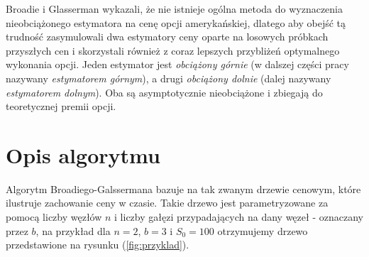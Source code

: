 \documentclass[]{pwr_wmat_praca_dyplomowa}
\theoremstyle{plain}
\numberwithin{theorem}{chapter}
\theoremstyle{definition}
\numberwithin{theorem}{chapter}
\begin{document}
\noindent Broadie i Glasserman wykazali, że nie istnieje ogólna metoda do wyznaczenia nieobciążonego estymatora na cenę opcji amerykańskiej, dlatego aby obejść tą trudność zasymulowali dwa estymatory ceny oparte na losowych próbkach przyszłych cen i skorzystali również z coraz lepszych przybliżeń optymalnego wykonania opcji. Jeden estymator jest \textit{obciążony górnie} (w dalszej części pracy nazywany \textit{estymatorem górnym}), a drugi \textit{obciążony dolnie} (dalej nazywany \textit{estymatorem dolnym}). Oba są asymptotycznie nieobciążone i zbiegają do teoretycznej premii opcji.

\section{Opis algorytmu}

Algorytm Broadiego-Galssermana bazuje na tak zwanym drzewie cenowym, które ilustruje zachowanie ceny w czasie. Takie drzewo jest parametryzowane za pomocą liczby węzłów $n$ i liczby gałęzi przypadających na dany węzeł - oznaczany przez $b$, na przykład dla $n=2$, $b=3$ i $S_0 = 100$ otrzymujemy drzewo przedstawione na rysunku (\ref{fig:przyklad}).
\end{document}
